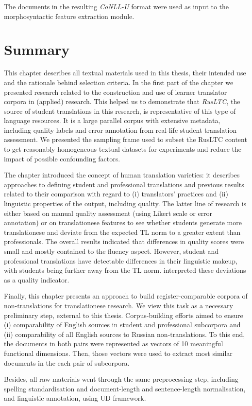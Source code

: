The documents in the resulting \textit{CoNLL-U} format were used as input to the morphosyntactic feature extraction module. 
\section{\label{sec:sum3}Summary} 
This chapter describes all textual materials used in this thesis, their intended use and the rationale behind selection criteria.
In the first part of the chapter we presented research related to the construction and use of learner translator corpora in (applied) research. This helped us to demonstrate that \textit{RusLTC}, the source of student translations in this research, is representative of this type of language resources. It is a large parallel corpus with extensive metadata, including quality labels and error annotation from real-life student translation assessment. We presented the sampling frame used to subset the RusLTC content to get reasonably homogeneous textual datasets for experiments and reduce the impact of possible confounding factors. 

The chapter introduced the concept of human translation varieties: it describes approaches to defining student and professional translations and previous results related to their comparison with regard to (i) translators' practices and (ii) linguistic properties of the output, including quality. The latter line of research is either based on manual quality assessment (using Likert scale or error annotation) or on translationese features to see whether students generate more translationese and deviate from the expected TL norm to a greater extent than professionals. The overall results indicated that differences in quality scores were small and mostly contained to the fluency aspect. However, student and professional translations have detectable differences in their linguistic makeup, with students being further away from the TL norm. \citet{Sutter2017} interpreted these deviations as a quality indicator. 

Finally, this chapter presents an approach to build register-comparable corpora of non-translations for translationese research. We view this task as a necessary preliminary step, external to this thesis. Corpus-building efforts aimed to ensure (i) comparability of English sources in student and professional subcorpora and (ii) comparability of all English sources to Russian non-translations. To this end, the documents in both pairs were represented as vectors of 10 meaningful functional dimensions. Then, those vectors were used to extract most similar documents in the each pair of subcorpora.

Besides, all raw materials went through the same preprocessing step, including spelling standardisation and document-length and sentence-length normalisation, and linguistic annotation, using UD framework.